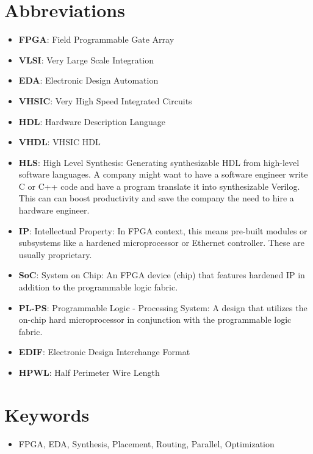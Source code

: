 \documentclass{article}
\begin{document}
\section{Abbreviations}
\begin{itemize}[label={--}, left=0.25cm] %
    \item \textbf{FPGA}: Field Programmable Gate Array
    \item \textbf{VLSI}: Very Large Scale Integration
    \item \textbf{EDA}: Electronic Design Automation
    \item \textbf{VHSIC}: Very High Speed Integrated Circuits
    \item \textbf{HDL}: Hardware Description Language
    \item \textbf{VHDL}: VHSIC HDL
    \item \textbf{HLS}: High Level Synthesis: Generating synthesizable HDL from high-level software languages. A company might want to have a software engineer write C or C++ code and have a program translate it into synthesizable Verilog. This can can boost productivity and save the company the need to hire a hardware engineer.
    \item \textbf{IP}: Intellectual Property: In FPGA context, this means pre-built modules or subsystems like a hardened microprocessor or Ethernet controller. These are usually proprietary.
    \item \textbf{SoC}: System on Chip: An FPGA device (chip) that features hardened IP in addition to the programmable logic fabric.
    \item \textbf{PL-PS}: Programmable Logic - Processing System: A design that utilizes the on-chip hard microprocessor in conjunction with the programmable logic fabric.
    \item \textbf{EDIF}: Electronic Design Interchange Format
    \item \textbf{HPWL}: Half Perimeter Wire Length
\end{itemize}

\section{Keywords}
\begin{itemize}
    \item FPGA, EDA, Synthesis, Placement, Routing, Parallel, Optimization
\end{itemize}
\end{document}
